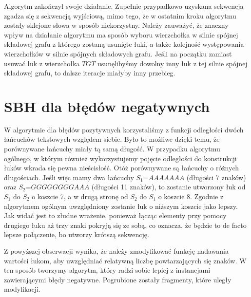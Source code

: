\documentclass[a4paper,10pt]{article}
\begin{document}
Algorytm zakończył swoje działanie. Zupełnie przypadkowo uzyskana sekwencja zgadza się z sekwencją wyjściową, mimo tego, że w ostatnim kroku algorytmu zostały sklejone słowa w sposób niekorzystny.
Należy zauważyć, że znaczny wpływ na działanie algorytmu ma sposób wyboru wierzchołka w silnie spójnej składowej grafu z
którego zostaną usunięte łuki, a także kolejność występowania wierzchołków w silnie spójnych składowych grafu. Jeśli na 
początku zamiast usuwać łuk z wierzchołka $TGT$ usunęlibyśmy dowolny inny łuk z tej silnie spójnej składowej grafu, to dalsze iteracje miałyby inny przebieg.

\section{SBH dla błędów negatywnych}
W algorytmie dla błędów pozytywnych korzystaliśmy z funkcji odległości dwóch łańcuchów tekstowych względem siebie. Było 
to możliwe dzięki temu, że porównywane łańcuchy miały tą samą długość. W przypadku algorytmu ogólnego, w którym również 
wykorzystujemy pojęcie odległości do konstrukcji łuków wkrada się pewna nieścisłość. Otóż porównywane są łańcuchy o 
różnych długościach. Jeśli więc mamy dwa łańcuchy $S_1$=$AAAAAAA$ (długości 7 znaków) oraz $S_2$=$GGGGGGGGAAA$ (długości 11 znaków), 
to zostanie utworzony łuk od $S_1$ do $S_2$ o koszcie 7, a w drugą stronę od $S_2$ do $S_1$ o koszcie 8. Zgodnie z algorytmem 
ogólnym uwzględniony zostanie łuk o niższym koszcie jako lepszy. Jak widać jest to złudne wrażenie, ponieważ łącząc elementy 
przy pomocy drugiego łuku aż trzy znaki pokryją się ze sobą, co oznacza, że będzie to de facto lepsze połączenie, bo utworzy krótszą sekwencję.

Z powyższej obserwacji wynika, że należy zmodyfikować funkcję nadawania wartości łukom, aby uwzględniać relatywną 
liczbę powtarzających się znaków. W ten sposób tworzymy algorytm, który radzi sobie lepiej z instancjami zawierającymi błędy negatywne. Pogrubione zostały fragmenty, które uległy modyfikacji.
\end{document}
